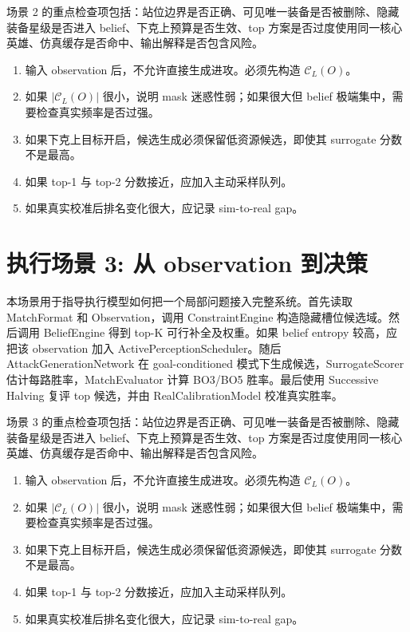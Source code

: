 \documentclass[UTF8,12pt,openany]{ctexbook}
\newcommand{\Ccal}{\mathcal{C}}
\begin{document}
场景 2 的重点检查项包括：站位边界是否正确、可见唯一装备是否被删除、隐藏装备星级是否进入 belief、下克上预算是否生效、top 方案是否过度使用同一核心英雄、仿真缓存是否命中、输出解释是否包含风险。

\begin{enumerate}[leftmargin=2em]
\item 输入 observation 后，不允许直接生成进攻。必须先构造 $\Ccal_L(O)$。
\item 如果 $|\Ccal_L(O)|$ 很小，说明 mask 迷惑性弱；如果很大但 belief 极端集中，需要检查真实频率是否过强。
\item 如果下克上目标开启，候选生成必须保留低资源候选，即使其 surrogate 分数不是最高。
\item 如果 top-1 与 top-2 分数接近，应加入主动采样队列。
\item 如果真实校准后排名变化很大，应记录 sim-to-real gap。
\end{enumerate}


\section{执行场景 3: 从 observation 到决策}
本场景用于指导执行模型如何把一个局部问题接入完整系统。首先读取 MatchFormat 和 Observation，调用 ConstraintEngine 构造隐藏槽位候选域。然后调用 BeliefEngine 得到 top-K 可行补全及权重。如果 belief entropy 较高，应把该 observation 加入 ActivePerceptionScheduler。随后 AttackGenerationNetwork 在 goal-conditioned 模式下生成候选，SurrogateScorer 估计每路胜率，MatchEvaluator 计算 BO3/BO5 胜率。最后使用 Successive Halving 复评 top 候选，并由 RealCalibrationModel 校准真实胜率。

场景 3 的重点检查项包括：站位边界是否正确、可见唯一装备是否被删除、隐藏装备星级是否进入 belief、下克上预算是否生效、top 方案是否过度使用同一核心英雄、仿真缓存是否命中、输出解释是否包含风险。

\begin{enumerate}[leftmargin=2em]
\item 输入 observation 后，不允许直接生成进攻。必须先构造 $\Ccal_L(O)$。
\item 如果 $|\Ccal_L(O)|$ 很小，说明 mask 迷惑性弱；如果很大但 belief 极端集中，需要检查真实频率是否过强。
\item 如果下克上目标开启，候选生成必须保留低资源候选，即使其 surrogate 分数不是最高。
\item 如果 top-1 与 top-2 分数接近，应加入主动采样队列。
\item 如果真实校准后排名变化很大，应记录 sim-to-real gap。
\end{enumerate}
\end{document}
